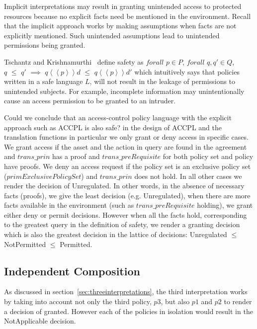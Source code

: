 Implicit interpretations may result in granting unintended access to protected resources because no explicit facts need be mentioned in the environment. Recall that the implicit approach works by making assumptions when facts are not explicitly mentioned. Such unintended assumptions lead to unintended permissions being granted.

Tschantz and Krishnamurthi~\cite{Tschantz} define safety as $forall$ $p \in P$, $forall$ $q, q' \in Q$, \\$q$ $\leq$ $q'$ $\implies$ $q \left\langle\left\langle p  \right\rangle\right\rangle d$ $\leq$ $q \left\langle\left\langle p  \right\rangle\right\rangle d'$ which intuitively says that policies written in a safe language $L$, will not result in the leakage of permissions to unintended subjects. For example, incomplete information may unintentionally cause an access permission to be granted to an intruder. 

Could we conclude that an access-control policy language with the explicit approach such as \ac{ACCPL} is also safe? in the design of \ac{ACCPL} and the translation functions in particular we only grant or deny access in specific cases. We grant access if the asset and the action in query are found in the agreement and $trans\_prin$ has a proof and $trans\_preRequisite$ for both policy set and policy have proofs. We deny an access request if the policy set is an exclusive policy set ($primExclusivePolicySet$) and $trans\_prin$ does not hold. In all other cases we render the decision of Unregulated. In other words, in the absence of necessary facts (proofs), we give the least decision (e.g. Unregulated), when there are more facts available in the environment (such as $trans\_preRequisite$ holding), we grant either deny or permit decisions. However when all the facts hold, corresponding to the greatest query in the definition of safety, we render a granting decision which is also the greatest decision in the lattice of decisions: Unregulated $\leq$ NotPermitted $\leq$ Permitted.


\subsection{Independent Composition}

As discussed in section~\ref{sec:threeinterpretations}, the third interpretation works by taking into account not only the third policy, $p3$, but also $p1$ and $p2$ to render a decision of granted. However each of the policies in isolation would result in the NotApplicable decision. 

